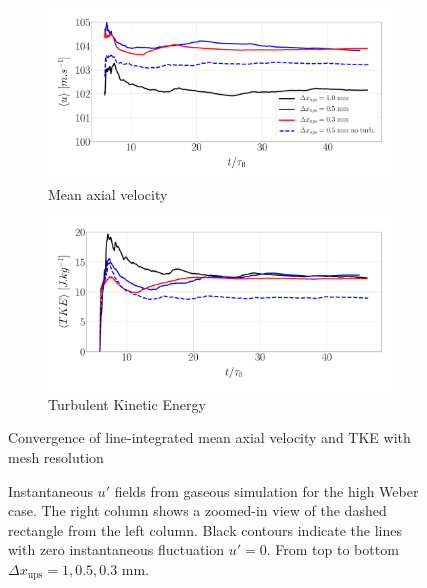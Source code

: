 \begin{figure}[ht]
\centering
\begin{subfigure}[b]{0.45\textwidth}
	\centering
   \includegraphics[scale=0.125]{./part2_developments/figures_ch5_resolved_JICF/results_ics_mesh_convergence_line_averages/U_MEAN.pdf}
   \vspace*{-0.30in}
   \caption{Mean axial velocity}
\end{subfigure}
\hfill
\begin{subfigure}[b]{0.45\textwidth}
	\centering
   \includegraphics[scale=0.125]{./part2_developments/figures_ch5_resolved_JICF/results_ics_mesh_convergence_line_averages/TKE.pdf}
   \vspace*{-0.30in}
   \caption{Turbulent Kinetic Energy}
\end{subfigure}
\caption{Convergence of line-integrated mean axial velocity and TKE with mesh resolution}
\label{fig:mesh_convergence_line_averages}
\end{figure}

\begin{figure}[ht]
\centering
{}
\caption[Instantaneous $u'$ fields from gaseous simulation for the high Weber case]{Instantaneous $u'$ fields from gaseous simulation for the high Weber case. The right column shows a zoomed-in view of the dashed rectangle from the left column. Black contours indicate the lines with zero instantaneous fluctuation $u' = 0$. From top to bottom $\Delta x_\mathrm{ups} = 1, 0.5, 0.3$ mm.}
\label{fig:ics_mesh_independency_study_up_fields}
\end{figure}



